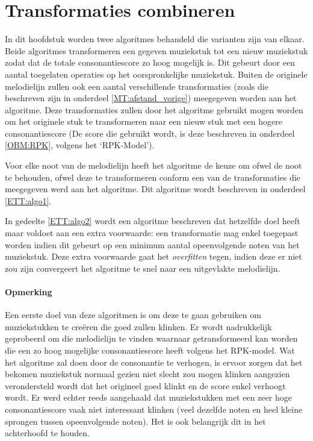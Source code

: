 \chapter{Transformaties combineren}
\label{hoofdstuk:ETT}

In dit hoofdstuk worden twee algoritmes behandeld die varianten zijn van elkaar. Beide algoritmes transformeren een gegeven muziekstuk tot een nieuw muziekstuk zodat dat de totale consonantiescore zo hoog mogelijk is. Dit gebeurt door een aantal toegelaten operaties op het oorspronkelijke muziekstuk. Buiten de originele melodielijn zullen ook een aantal verschillende transformaties (zoals die beschreven zijn in onderdeel \ref{MT:afstand_vorige}) meegegeven worden aan het algoritme. Deze transformaties zullen door het algoritme gebruikt mogen worden om het originele stuk te transformeren naar een nieuw stuk met een hogere consonantiescore (De score die gebruikt wordt, is deze beschreven in onderdeel \ref{OBM:RPK}, volgens het `RPK-Model').

Voor elke noot van de melodielijn heeft het algoritme de keuze om ofwel de noot te behouden, ofwel deze te transformeren conform een van de transformaties die meegegeven werd aan het algoritme. Dit algoritme wordt beschreven in onderdeel \ref{ETT:algo1}. 

In gedeelte \ref{ETT:algo2} wordt een algoritme beschreven dat hetzelfde doel heeft maar voldoet aan een extra voorwaarde: een transformatie mag enkel toegepast worden indien dit gebeurt op een minimum aantal opeenvolgende noten van het muziekstuk. Deze extra voorwaarde gaat het \textit{overfitten} tegen, indien deze er niet zou zijn convergeert het algoritme te snel naar een uitgevlakte melodielijn.

\subsubsection{Opmerking}
Een eerste doel van deze algoritmen is om deze te gaan gebruiken om muziekstukken te cre\"eren die goed zullen klinken. Er wordt nadrukkelijk geprobeerd om die melodielijn te vinden waarnaar getransformeerd kan worden die een zo hoog mogelijke consonantiescore heeft volgens het RPK-model. Wat het algoritme zal doen door de consonantie te verhogen, is ervoor zorgen dat het bekomen muziekstuk normaal gezien niet slecht zou mogen klinken aangezien verondersteld wordt dat het origineel goed klinkt en de score enkel verhoogt wordt. Er werd echter reeds aangehaald dat muziekstukken met een zeer hoge consonantiescore vaak niet interessant klinken (veel dezelfde noten en heel kleine sprongen tussen opeenvolgende noten). Het is ook belangrijk dit in het achterhoofd te houden. 


